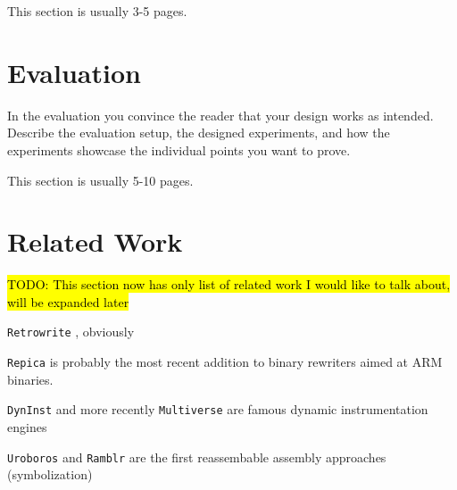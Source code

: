\documentclass[a4paper,11pt,oneside]{report}
\newcommand{\todo}[1]{%
	\begingroup 
	\sethlcolor{cyan}%
	\hl{TODO: #1}%
	\endgroup
}
\begin{document}
This section is usually 3-5 pages.


\chapter{Evaluation}

In the evaluation you convince the reader that your design works as intended.
Describe the evaluation setup, the designed experiments, and how the
experiments showcase the individual points you want to prove.

This section is usually 5-10 pages.


\chapter{Related Work}




\todo{This section now has only list of related work I would like to talk 
about, will be expanded later}

\texttt{Retrowrite} \cite{dinesh20oakland}, obviously


\texttt{Repica} \cite{repica} is probably the most recent addition to binary rewriters aimed 
at ARM binaries.  

\texttt{DynInst}\cite{dyninst} and more recently \texttt{Multiverse} 
\cite{multiverse} are  famous dynamic instrumentation engines

\texttt{Uroboros}\cite{uroboros} and \texttt{Ramblr}\cite{ramblr} are the first 
reassembable assembly approaches (symbolization)
\end{document}
